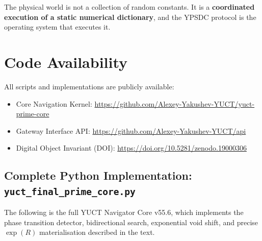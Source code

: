 \documentclass[12pt,a4paper]{article}
\theoremstyle{remark}
\begin{document}
	The physical world is not a collection of random constants. It is a \textbf{coordinated execution of a static numerical dictionary}, and the YPSDC protocol is the operating system that executes it.
	
	\section{Code Availability}
	
	All scripts and implementations are publicly available:
	
	\begin{itemize}
		\item Core Navigation Kernel: \url{https://github.com/Alexey-Yakushev-YUCT/yuct-prime-core}
		\item Gateway Interface API: \url{https://github.com/Alexey-Yakushev-YUCT/api}
		\item Digital Object Invariant (DOI): \url{https://doi.org/10.5281/zenodo.19000306}
	\end{itemize}
	
	\subsection*{Complete Python Implementation: \texttt{yuct\_final\_prime\_core.py}}
	\label{sec:code}
	
	The following is the full YUCT Navigator Core v55.6, which implements the phase transition detector, bidirectional search, exponential void shift, and precise \(\exp(R)\) materialisation described in the text.
	
\end{document}

